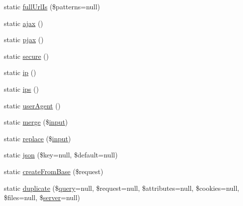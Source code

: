 \begin{DoxyCompactItemize}
\item 
static \mbox{\hyperlink{class_illuminate_1_1_support_1_1_facades_1_1_request_aa19fd01c7be2110f177b8cff6559efb2}{full\+Url\+Is}} (\$patterns=null)
\item 
static \mbox{\hyperlink{class_illuminate_1_1_support_1_1_facades_1_1_request_aecead1bc0512dadbebbf5e7aa74b2544}{ajax}} ()
\item 
static \mbox{\hyperlink{class_illuminate_1_1_support_1_1_facades_1_1_request_ab38ddcb23db31c0bc23ea576e28d868d}{pjax}} ()
\item 
static \mbox{\hyperlink{class_illuminate_1_1_support_1_1_facades_1_1_request_a80f6609d3acb22116e64c05d6e0ecfb9}{secure}} ()
\item 
static \mbox{\hyperlink{class_illuminate_1_1_support_1_1_facades_1_1_request_a4c0dc61a627ddae9c7c3ec74d845e483}{ip}} ()
\item 
static \mbox{\hyperlink{class_illuminate_1_1_support_1_1_facades_1_1_request_a907a99501b1a1f7a8349e71a5a51ee2b}{ips}} ()
\item 
static \mbox{\hyperlink{class_illuminate_1_1_support_1_1_facades_1_1_request_a3a185583cec2b7eefae89f509cb4f3ab}{user\+Agent}} ()
\item 
static \mbox{\hyperlink{class_illuminate_1_1_support_1_1_facades_1_1_request_a184ac93e1b0ebb5c9bd720a6bad67e95}{merge}} (\$\mbox{\hyperlink{class_illuminate_1_1_support_1_1_facades_1_1_request_a9ce57d739a5036919120eb369d80dd7a}{input}})
\item 
static \mbox{\hyperlink{class_illuminate_1_1_support_1_1_facades_1_1_request_a3d323a9c8ad910a8eb27ba08116eaf0b}{replace}} (\$\mbox{\hyperlink{class_illuminate_1_1_support_1_1_facades_1_1_request_a9ce57d739a5036919120eb369d80dd7a}{input}})
\item 
static \mbox{\hyperlink{class_illuminate_1_1_support_1_1_facades_1_1_request_ad03fe88fc6916a4a2a1a9f3da85bdc77}{json}} (\$key=null, \$default=null)
\item 
static \mbox{\hyperlink{class_illuminate_1_1_support_1_1_facades_1_1_request_aeda33757e75030fdc25f1c17afcc74d4}{create\+From\+Base}} (\$request)
\item 
static \mbox{\hyperlink{class_illuminate_1_1_support_1_1_facades_1_1_request_a811172c986cdc6ecc7cf8801bcdc6eb9}{duplicate}} (\$\mbox{\hyperlink{class_illuminate_1_1_support_1_1_facades_1_1_request_abaa6d157fd299de004ac80239a11aa5a}{query}}=null, \$request=null, \$attributes=null, \$cookies=null, \$files=null, \$\mbox{\hyperlink{class_illuminate_1_1_support_1_1_facades_1_1_request_aaea79f85875a529d365d560bde09bf16}{server}}=null)

\end{DoxyCompactItemize}
